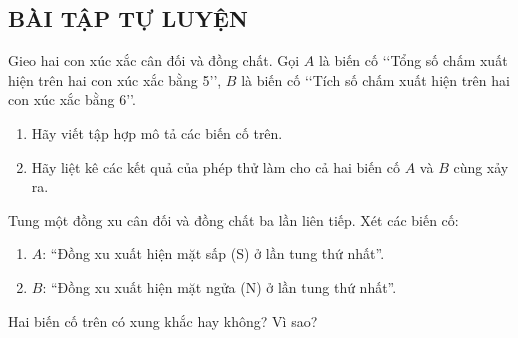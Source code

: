 \subsection{BÀI TẬP TỰ LUYỆN}

\begin{baitap}
	Gieo hai con xúc xắc cân đối và đồng chất. Gọi $A$ là biến cố \lq\lq Tổng số chấm xuất hiện trên hai con xúc xắc bằng 5\rq\rq, $B$ là biến cố \lq\lq Tích số chấm xuất hiện trên hai con xúc xắc bằng 6\rq\rq.
	\begin{enumerate}
		\item Hãy viết tập hợp mô tả các biến cố trên.
		\item Hãy liệt kê các kết quả của phép thử làm cho cả hai biến cố $A$ và $B$ cùng xảy ra.
	\end{enumerate}
\end{baitap}

\begin{baitap}%
	Tung một đồng xu cân đối và đồng chất ba lần liên tiếp. Xét các biến cố:
	\begin{enumerate}[]
		\item $A$: ``Đồng xu xuất hiện mặt sấp (S) ở lần tung thứ nhất''.
		\item $B$: ``Đồng xu xuất hiện mặt ngửa (N) ở lần tung thứ nhất''.
	\end{enumerate}
	Hai biến cố trên có xung khắc hay không? Vì sao?
\end{baitap} 

